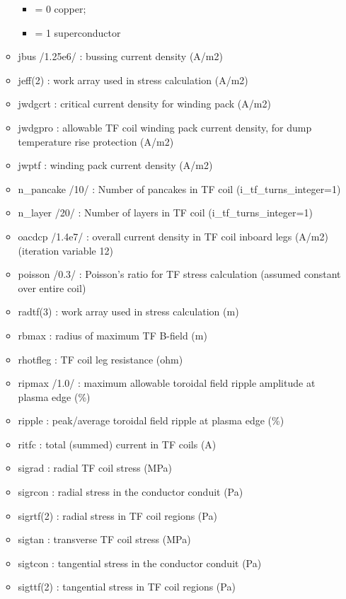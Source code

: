 \documentclass[]{article}
\providecommand{\tightlist}{%
  \setlength{\itemsep}{0pt}\setlength{\parskip}{0pt}}
\begin{document}
\begin{itemize}
\begin{itemize}
    \begin{itemize}
    \tightlist
    \item
      = 0 copper;
    \item
      = 1 superconductor
    \end{itemize}
  \item
    jbus /1.25e6/ : bussing current density (A/m2)
  \item
    jeff(2) : work array used in stress calculation (A/m2)
  \item
    jwdgcrt : critical current density for winding pack (A/m2)
  \item
    jwdgpro : allowable TF coil winding pack current density, for dump
    temperature rise protection (A/m2)
  \item
    jwptf : winding pack current density (A/m2)
  \item
    n\_pancake /10/ : Number of pancakes in TF coil
    (i\_tf\_turns\_integer=1)
  \item
    n\_layer /20/ : Number of layers in TF coil
    (i\_tf\_turns\_integer=1)
  \item
    oacdcp /1.4e7/ : overall current density in TF coil inboard legs
    (A/m2) (iteration variable 12)
  \item
    poisson /0.3/ : Poisson's ratio for TF stress calculation (assumed
    constant over entire coil)
  \item
    radtf(3) : work array used in stress calculation (m)
  \item
    rbmax : radius of maximum TF B-field (m)
  \item
    rhotfleg : TF coil leg resistance (ohm)
  \item
    ripmax /1.0/ : maximum allowable toroidal field ripple amplitude at
    plasma edge (\%)
  \item
    ripple : peak/average toroidal field ripple at plasma edge (\%)
  \item
    ritfc : total (summed) current in TF coils (A)
  \item
    sigrad : radial TF coil stress (MPa)
  \item
    sigrcon : radial stress in the conductor conduit (Pa)
  \item
    sigrtf(2) : radial stress in TF coil regions (Pa)
  \item
    sigtan : transverse TF coil stress (MPa)
  \item
    sigtcon : tangential stress in the conductor conduit (Pa)
  \item
    sigttf(2) : tangential stress in TF coil regions (Pa)

\end{itemize}
\end{itemize}
\end{document}

